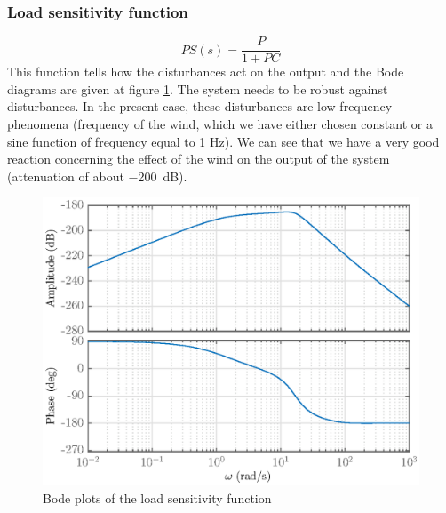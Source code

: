 \subsubsection{Load sensitivity function}
$$
PS(s) = \dfrac{P}{1 + PC}
$$
This function tells how the disturbances act on the output and the Bode diagrams are given at figure \ref{fig:load}. The system needs to be robust against disturbances. In the present case, these disturbances are low frequency phenomena (frequency of the wind, which we have either chosen constant or a sine function of frequency equal to 1 Hz). We can see that we have a very good reaction concerning the effect of the wind on the output of the system (attenuation of about \SI{-200}{\deci\bel}).
\begin{figure}[H]
    \centering
    \includegraphics[scale = 0.8]{resources/eps/4-Val/PS.eps}
    \caption{Bode plots of the load sensitivity function}
    \label{fig:load}
\end{figure}

